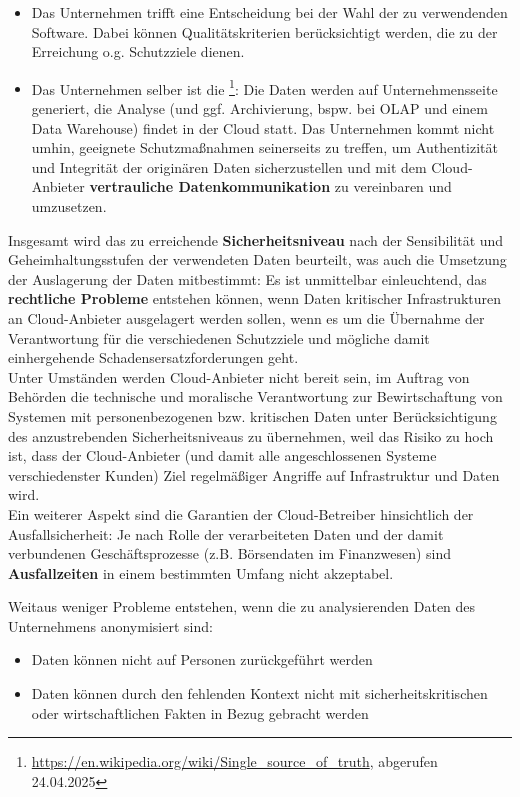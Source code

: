 \begin{itemize}
    \itemsep0.5em
    \item Das Unternehmen trifft eine Entscheidung bei der Wahl der zu verwendenden Software.
    Dabei können Qualitätskriterien berücksichtigt werden, die zu der Erreichung o.g. Schutzziele dienen.
    \item Das Unternehmen selber ist die \footnote{
    \url{https://en.wikipedia.org/wiki/Single_source_of_truth}, abgerufen 24.04.2025
    }: Die Daten werden auf Unternehmensseite generiert, die Analyse (und ggf. Archivierung, bspw. bei OLAP und einem Data Warehouse) findet in der Cloud statt.
    Das Unternehmen kommt nicht umhin, geeignete Schutzmaßnahmen seinerseits zu treffen, um Authentizität und Integrität der originären Daten sicherzustellen und mit dem Cloud-Anbieter \textbf{vertrauliche Datenkommunikation} zu vereinbaren und umzusetzen.
\end{itemize}

\noindent
Insgesamt wird das zu erreichende \textbf{Sicherheitsniveau} nach der Sensibilität und Geheimhaltungsstufen der verwendeten Daten beurteilt, was auch die Umsetzung der Auslagerung der Daten mitbestimmt: Es ist unmittelbar einleuchtend, das \textbf{rechtliche Probleme} entstehen können, wenn Daten kritischer Infrastrukturen an Cloud-Anbieter ausgelagert werden sollen, wenn es um die Übernahme der Verantwortung für die verschiedenen Schutzziele und mögliche damit einhergehende Schadensersatzforderungen geht.\\
Unter Umständen werden Cloud-Anbieter nicht bereit sein, im Auftrag von Behörden die technische und moralische Verantwortung zur Bewirtschaftung von Systemen mit personenbezogenen bzw. kritischen Daten unter Berücksichtigung des anzustrebenden Sicherheitsniveaus zu übernehmen, weil das Risiko zu hoch ist, dass der Cloud-Anbieter (und damit alle angeschlossenen Systeme verschiedenster Kunden) Ziel regelmäßiger Angriffe auf Infrastruktur und Daten wird.\\
Ein weiterer Aspekt sind die Garantien der Cloud-Betreiber hinsichtlich der Ausfallsicherheit: Je nach Rolle der verarbeiteten Daten und der damit verbundenen Geschäftsprozesse (z.B. Börsendaten im Finanzwesen) sind \textbf{Ausfallzeiten} in einem bestimmten Umfang nicht akzeptabel.

\noindent
Weitaus weniger Probleme entstehen, wenn die zu analysierenden Daten des Unternehmens anonymisiert sind:

\begin{itemize}
    \itemsep0.5em
    \item Daten können nicht auf Personen zurückgeführt werden
    \item Daten können durch den fehlenden Kontext nicht mit sicherheitskritischen oder wirtschaftlichen Fakten in Bezug gebracht werden
\end{itemize}

